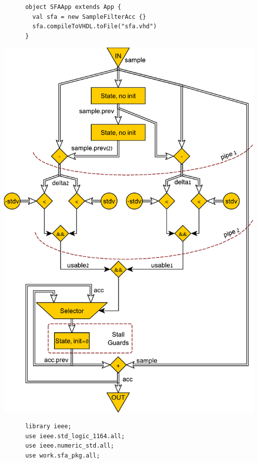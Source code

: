 \begin{table}[t!]
\begin{minipage}[t][23cm][t]{0.46\linewidth}
\begin{verbatim}
      object SFAApp extends App {
        val sfa = new SampleFilterAcc {}
        sfa.compileToVHDL.toFile("sfa.vhd")
      }
    \end{verbatim}
    \label{fig:SFADFiant}
    \vfill
    \includegraphics[width=\linewidth]{graphics/sfa.pdf}
		\label{fig:SFADraw}
  \end{minipage}
  \hfill
  \begin{minipage}[t][23cm][t]{0.51\linewidth}
    \centering
    \begin{verbatim}
      library ieee;
      use ieee.std_logic_1164.all;
      use ieee.numeric_std.all;
      use work.sfa_pkg.all;
      

\end{verbatim}
\end{minipage}
\end{table}
